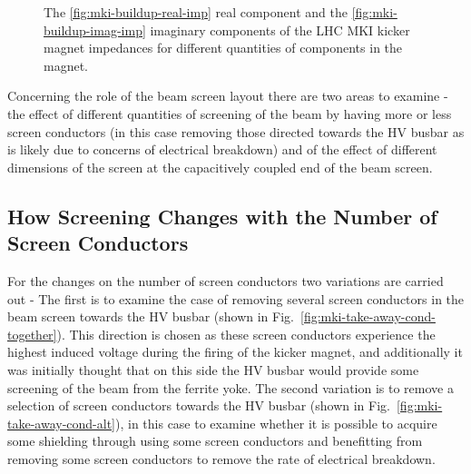\begin{figure}
\label{fig:mki-buildup-impedance}
\caption{The \ref{fig:mki-buildup-real-imp} real component and the \ref{fig:mki-buildup-imag-imp} imaginary components of the LHC MKI kicker magnet impedances for different quantities of components in the magnet.}
\end{figure}


Concerning the role of the beam screen layout there are two areas to examine - the effect of different quantities of screening of the beam by having more or less screen conductors (in this case removing those directed towards the HV busbar as is likely due to concerns of electrical breakdown) and of the effect of different dimensions of the screen at the capacitively coupled end of the beam screen.

\subsection{How Screening Changes with the Number of Screen Conductors}

For the changes on the number of screen conductors two variations are carried out - The first is to examine the case of removing several screen conductors in the beam screen towards the HV busbar (shown in Fig.~\ref{fig:mki-take-away-cond-together}). This direction is chosen as these screen conductors experience the highest induced voltage during the firing of the kicker magnet, and additionally it was initially thought that on this side the HV busbar would provide some screening of the beam from the ferrite yoke. The second variation is to remove a selection of screen conductors towards the HV busbar (shown in Fig.~\ref{fig:mki-take-away-cond-alt}), in this case to examine whether it is possible to acquire some shielding through using some screen conductors and benefitting from removing some screen conductors to remove the rate of electrical breakdown.

